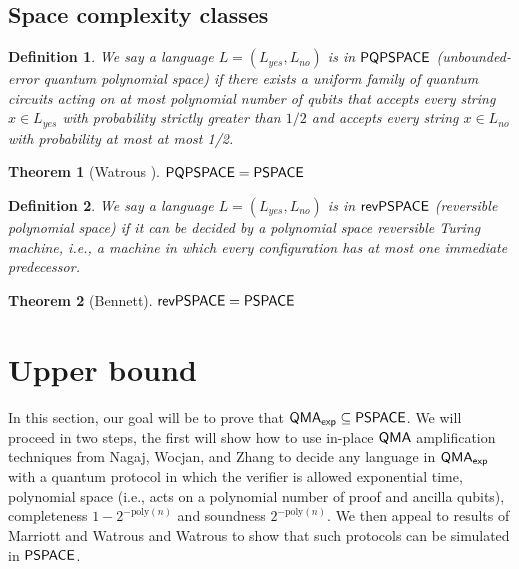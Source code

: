 \documentclass[11pt]{article}
\newtheorem{theorem}{Theorem}
\newtheorem{definition}{Definition}
\theoremstyle{definition}
\theoremstyle{remark}
\newcommand\PSPACE{{\sf{PSPACE}}}
\newcommand\QMAexp{{\sf{QMA}_{exp}}}
\newcommand\PQPSPACE{{\sf{PQPSPACE}}}
\newcommand\revPSPACE{{\sf{revPSPACE}}}
\newcommand{\poly}{\textrm{poly}}
\begin{document}
\subsection{Space complexity classes}
\begin{definition}We say a language $L=(L_{yes},L_{no})$ is in $\PQPSPACE$ (unbounded-error quantum polynomial space) if there exists a uniform family of quantum circuits acting on at most polynomial number of qubits that accepts every string $x\in L_{yes}$ with probability strictly greater than $1/2$ and accepts every string $x \in L_{no}$ with probability at most at most 1/2.
	
\end{definition}
\begin{theorem}[Watrous \cite{Watrous99}]\label{thm:pqpspace} $\PQPSPACE=\PSPACE$	
\end{theorem}

\begin{definition}We say a language $L=(L_{yes},L_{no})$ is in $\revPSPACE$ (reversible polynomial space) if it can be decided by a polynomial space reversible Turing machine, i.e., a machine in which every configuration has at most one immediate predecessor.  	
\end{definition}

\begin{theorem}[Bennett\cite{bennett89}]\label{thm:revpspace}$\revPSPACE=\PSPACE$
\end{theorem}

\section{Upper bound}
In this section, our goal will be to prove that $\QMAexp\subseteq\PSPACE$.  We will proceed in two steps, the first will show how to use in-place $\operatorname{\mathsf{QMA}}$ amplification techniques from Nagaj, Wocjan, and Zhang \cite{nwz11} to decide any language in $\QMAexp$ with a quantum protocol in which the verifier is allowed exponential time, polynomial space (i.e., acts on a polynomial number of proof and ancilla qubits), completeness $1-2^{-\poly(n)}$ and soundness $2^{-\poly(n)}$.  We then appeal to results of Marriott and Watrous \cite{mw05} and  Watrous \cite{Watrous99} to show that such protocols can be simulated in $\PSPACE$.
\end{document}
